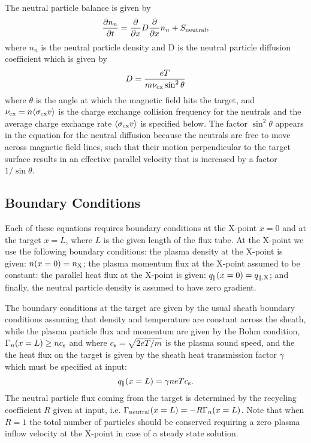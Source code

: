 \documentclass[amsmath,amssymb,a4]{revtex4}
\begin{document}
\noindent The neutral particle balance is given by
\begin{equation}\label{neutral_particle_balance}
    {\partial n_n \over \partial t} = {\partial \over \partial x} D {\partial \over \partial x} n_n + S_{\rm neutral},
\end{equation}
where $n_n$ is the neutral particle density and D is the neutral particle diffusion coefficient which is given by \cite{nakazawa2000}
\begin{equation}\label{neutral_diffusion_coefficient}
    D = { eT \over m \nu_{\rm cx} \sin^2\theta }
\end{equation}
where $\theta$ is the angle at which the magnetic field hits the target, and $\nu_{\rm cx} = n \langle\sigma_{\rm cx} v\rangle$ is the charge exchange collision frequency for the neutrals and the average charge exchange rate $\langle\sigma_{\rm cx} v\rangle$ is specified below. The factor $\sin^2\theta$ appears in the equation for the neutral diffusion because the neutrals are free to move across magnetic field lines, such that their motion perpendicular to the target surface results in an effective parallel velocity that is increased by a factor $1/\sin\theta$.


\subsection{Boundary Conditions}

Each of these equations requires boundary conditions at the X-point $x=0$ and at the target $x=L$, where $L$ is the given length of the flux tube. At the X-point we use the following boundary conditions:
the plasma density at the X-point is given: $n(x=0) = n_{\rm X}$; the plasma momentum flux at the X-point assumed to be constant: the parallel heat flux at the X-point is given:  $q_\parallel(x=0) = q_{\parallel,\rm X}$; and finally, the neutral particle density is assumed to have zero gradient.

The boundary conditions at the target are given by the usual sheath boundary conditions assuming that density and temperature are constant across the sheath, while the plasma particle flux and momentum are given by the Bohm condition, $\Gamma_n(x=L) \ge n c_{\rm s}$ and  where $c_{\rm s} = \sqrt{2eT/m}$ is the plasma sound speed, and the the heat flux on the target is given by the sheath heat transmission factor $\gamma$ which must be specified at input:
\begin{equation}\label{sheath_heat_transmission}
    q_\parallel(x=L) = \gamma n e T c_{\rm s}.
\end{equation}
The neutral particle flux coming from the target is determined by the recycling coefficient $R$ given at input, i.e. $\Gamma_{\rm neutral}(x=L) = - R \Gamma_n(x=L)$. Note that when $R=1$ the total number of particles should be conserved requiring a zero plasma inflow velocity at the X-point in case of a steady state solution.
\end{document}
